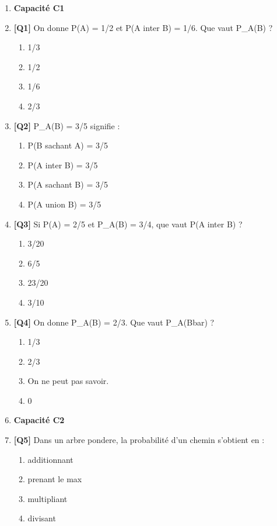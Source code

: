 \begin{enumerate}

\item[] \textbf{Capacité C1}

\item \textbf{[Q1]} On donne P(A) = 1/2 et P(A inter B) = 1/6. Que vaut P\_A(B) ?
  \begin{enumerate}[label=\Alph*.]
    \item 1/3
    \item 1/2
    \item 1/6
    \item 2/3
  \end{enumerate}

\item \textbf{[Q2]} P\_A(B) = 3/5 signifie :
  \begin{enumerate}[label=\Alph*.]
    \item P(B sachant A) = 3/5
    \item P(A inter B) = 3/5
    \item P(A sachant B) = 3/5
    \item P(A union B) = 3/5
  \end{enumerate}

\item \textbf{[Q3]} Si P(A) = 2/5 et P\_A(B) = 3/4, que vaut P(A inter B) ?
  \begin{enumerate}[label=\Alph*.]
    \item 3/20
    \item 6/5
    \item 23/20
    \item 3/10
  \end{enumerate}

\item \textbf{[Q4]} On donne P\_A(B) = 2/3. Que vaut P\_A(Bbar) ?
  \begin{enumerate}[label=\Alph*.]
    \item 1/3
    \item 2/3
    \item On ne peut pas savoir.
    \item 0
  \end{enumerate}

\item[] \textbf{Capacité C2}

\item \textbf{[Q5]} Dans un arbre pondere, la probabilité d'un chemin s'obtient en :
  \begin{enumerate}[label=\Alph*.]
    \item additionnant
    \item prenant le max
    \item multipliant
    \item divisant
  \end{enumerate}


\end{enumerate}
